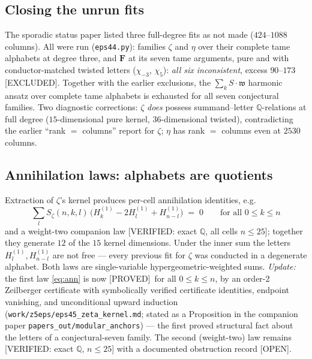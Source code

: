 \documentclass[11pt,reqno]{amsart}
\theoremstyle{plain}
\theoremstyle{definition}
\theoremstyle{remark}
\newcommand{\Q}{\mathbb{Q}}
\newcommand{\HH}[2]{H^{(#1)}_{#2}}
\newcommand{\Proved}{\textup{\textsf{[PROVED]}}}
\newcommand{\VerifiedR}[1]{\textup{\textsf{[VERIFIED: #1]}}}
\newcommand{\Excluded}{\textup{\textsf{[EXCLUDED]}}}
\newcommand{\Open}{\textup{\textsf{[OPEN]}}}
\begin{document}
\subsection{Closing the unrun fits}\label{sec:app3}
The sporadic status paper listed three full-degree fits as not made
($424$--$1088$ columns). All were run
(\texttt{eps44.py}): families $\zeta$ and $\eta$ over their complete tame
alphabets at degree three, and $\mathbf F$ at its seven tame arguments, pure
and with conductor-matched twisted letters ($\chi_{-3}$, $\chi_5$):
\emph{all six inconsistent}, excess $90$--$173$ \Excluded. Together with the
earlier exclusions, the $\sum_kS\cdot\mathfrak w$ harmonic ansatz over
complete tame alphabets is exhausted for all seven conjectural families.
Two diagnostic corrections: $\zeta$ \emph{does} possess summand--letter
$\Q$-relations at full degree ($15$-dimensional pure kernel,
$36$-dimensional twisted), contradicting the earlier ``rank $=$ columns''
report for $\zeta$; $\eta$ has rank $=$ columns even at $2530$ columns.

\subsection{Annihilation laws: alphabets are quotients}\label{sec:app4}
Extraction of $\zeta$'s kernel produces per-cell annihilation identities,
e.g.
\begin{equation}\label{eq:ann}
\sum_{l}S_\zeta(n,k,l)\,\bigl(\HH1k-2\HH1l+\HH1{n-l}\bigr)\;=\;0
\qquad\text{for all }0\le k\le n
\end{equation}
and a weight-two companion law
\VerifiedR{exact $\Q$, all cells $n\le25$}; together they generate $12$ of
the $15$ kernel dimensions. Under the inner sum the letters
$\HH1l,\HH1{n-l}$ are not free --- every previous fit for $\zeta$ was
conducted in a degenerate alphabet. Both laws are single-variable
hypergeometric-weighted sums. \emph{Update:} the first law
\eqref{eq:ann} is now \Proved\ for all $0\le k\le n$, by an order-2
Zeilberger certificate with symbolically verified certificate identities,
endpoint vanishing, and unconditional upward induction
(\texttt{work/z5eps/eps45\_zeta\_kernel.md}; stated as a Proposition in
the companion paper \texttt{papers\_out/modular\_anchors}) --- the first
proved structural fact about the letters of a conjectural-seven family.
The second (weight-two) law remains \VerifiedR{exact $\Q$, $n\le25$} with
a documented obstruction record \Open.
\end{document}

